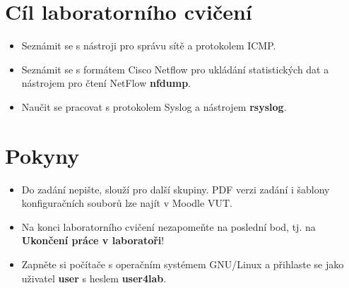 %
\section*{Cíl laboratorního cvičení}
\begin{itemize}
  \item Seznámit se s nástroji pro správu sítě a protokolem ICMP.
  \item Seznámit se s formátem Cisco Netflow pro ukládání statistických dat a nástrojem pro čtení NetFlow {\bf nfdump}.
  \item Naučit se pracovat s protokolem Syslog a nástrojem {\bf rsyslog}.
\end{itemize}

\section*{Pokyny}
\begin{itemize}
  \item Do zadání nepište, slouží pro další skupiny. PDF verzi zadání
  i šablony konfiguračních souborů lze najít v Moodle VUT.
  
  \item Na konci laboratorního cvičení nezapomeňte na poslední bod,
  tj. na {\bf Ukončení práce v laboratoři}!
  
  \item Zapněte si počítače s operačním systémem GNU/Linux a přihlaste se jako uživatel {\bf user} s heslem {\bf user4lab}.
\end{itemize}

\newpage

